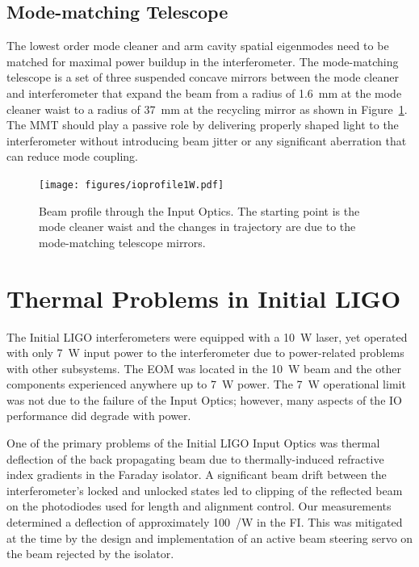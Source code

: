 \subsection{Mode-matching Telescope}
The lowest order mode cleaner and arm cavity spatial eigenmodes need
to be matched for maximal power buildup in the interferometer. The
mode-matching telescope is a set of three suspended concave mirrors
between the mode cleaner and interferometer that expand the beam from
a radius of 1.6~mm at the mode cleaner waist to a radius of 37~mm at
the recycling mirror as shown in Figure~\ref{fig:ioprofile}. The MMT
should play a passive role by delivering properly shaped light to the
interferometer without introducing beam jitter or any significant
aberration that can reduce mode coupling.

\begin{figure}
\begin{centering}
\texttt{[image: figures/ioprofile1W.pdf]}
\caption[Beam profile through the Input Optics]{Beam profile through
  the Input Optics. The starting point is the mode cleaner waist and
  the changes in trajectory are due to the mode-matching telescope
  mirrors.}
\label{fig:ioprofile}
\end{centering}
\end{figure}

\section{Thermal Problems in Initial LIGO}
\label{sec:problems}
The Initial LIGO interferometers were equipped with a 10~W laser, yet
operated with only 7~W input power to the interferometer due to
power-related problems with other subsystems. The EOM was located in
the 10~W beam and the other components experienced anywhere up to 7~W
power. The 7~W operational limit was not due to the failure of the
Input Optics; however, many aspects of the IO performance did degrade
with power.

One of the primary problems of the Initial LIGO Input Optics
\citep{Adhikari1998Input} was thermal deflection of the back
propagating beam due to thermally-induced refractive index gradients
in the Faraday isolator. A significant beam drift between the
interferometer's locked and unlocked states led to clipping of the
reflected beam on the photodiodes used for length and alignment
control. Our measurements determined a deflection of approximately
100~\microrad/W in the FI.  This was mitigated at the time by the
design and implementation of an active beam steering servo on the beam
rejected by the isolator.

